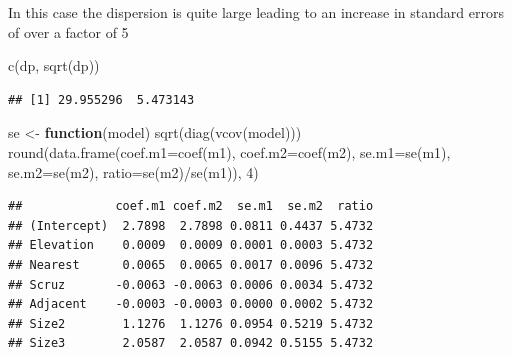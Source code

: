 \documentclass[
  ignorenonframetext,
]{beamer}
\newenvironment{Shaded}{\begin{snugshade}}{\end{snugshade}}
\newcommand{\AttributeTok}[1]{\textcolor[rgb]{0.77,0.63,0.00}{#1}}
\newcommand{\ControlFlowTok}[1]{\textcolor[rgb]{0.13,0.29,0.53}{\textbf{#1}}}
\newcommand{\DecValTok}[1]{\textcolor[rgb]{0.00,0.00,0.81}{#1}}
\newcommand{\FunctionTok}[1]{\textcolor[rgb]{0.00,0.00,0.00}{#1}}
\newcommand{\NormalTok}[1]{#1}
\newcommand{\OtherTok}[1]{\textcolor[rgb]{0.56,0.35,0.01}{#1}}
\newcommand{\SpecialCharTok}[1]{\textcolor[rgb]{0.00,0.00,0.00}{#1}}
\begin{document}
\begin{frame}[fragile]{}
\protect\hypertarget{section-6}{}
In this case the dispersion is quite large leading to an increase in
standard errors of over a factor of 5

\vspace{12pt}
\tiny

\begin{Shaded}
\begin{Highlighting}[]
\FunctionTok{c}\NormalTok{(dp, }\FunctionTok{sqrt}\NormalTok{(dp))}
\end{Highlighting}
\end{Shaded}

\begin{verbatim}
## [1] 29.955296  5.473143
\end{verbatim}

\begin{Shaded}
\begin{Highlighting}[]
\NormalTok{se }\OtherTok{\textless{}{-}} \ControlFlowTok{function}\NormalTok{(model) }\FunctionTok{sqrt}\NormalTok{(}\FunctionTok{diag}\NormalTok{(}\FunctionTok{vcov}\NormalTok{(model)))}
\FunctionTok{round}\NormalTok{(}\FunctionTok{data.frame}\NormalTok{(}\AttributeTok{coef.m1=}\FunctionTok{coef}\NormalTok{(m1), }\AttributeTok{coef.m2=}\FunctionTok{coef}\NormalTok{(m2), }\AttributeTok{se.m1=}\FunctionTok{se}\NormalTok{(m1), }\AttributeTok{se.m2=}\FunctionTok{se}\NormalTok{(m2), }
                 \AttributeTok{ratio=}\FunctionTok{se}\NormalTok{(m2)}\SpecialCharTok{/}\FunctionTok{se}\NormalTok{(m1)), }\DecValTok{4}\NormalTok{)}
\end{Highlighting}
\end{Shaded}

\begin{verbatim}
##             coef.m1 coef.m2  se.m1  se.m2  ratio
## (Intercept)  2.7898  2.7898 0.0811 0.4437 5.4732
## Elevation    0.0009  0.0009 0.0001 0.0003 5.4732
## Nearest      0.0065  0.0065 0.0017 0.0096 5.4732
## Scruz       -0.0063 -0.0063 0.0006 0.0034 5.4732
## Adjacent    -0.0003 -0.0003 0.0000 0.0002 5.4732
## Size2        1.1276  1.1276 0.0954 0.5219 5.4732
## Size3        2.0587  2.0587 0.0942 0.5155 5.4732
\end{verbatim}
\end{frame}
\end{document}
